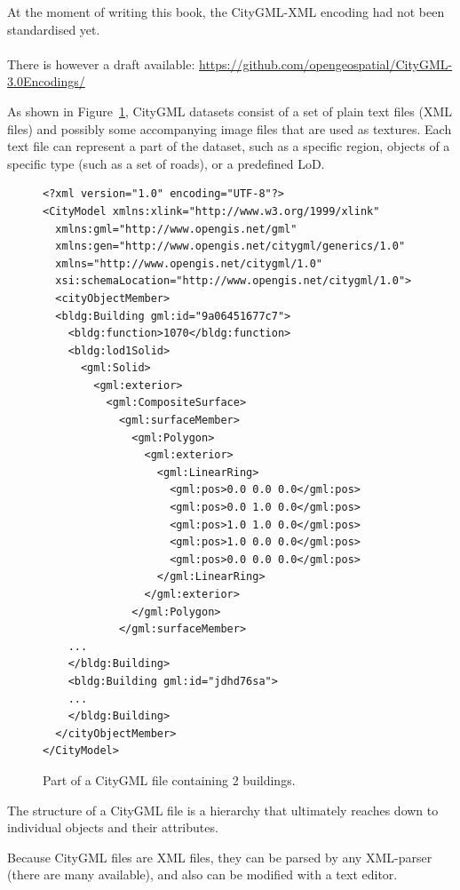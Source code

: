 \begin{kaobox-toread}[frametitle=\faExclamationTriangle\ There is not XML encoding yet for CityGML v3.0.0]
  At the moment of writing this book, the CityGML-XML encoding had not been standardised yet.
  \\ \\
  There is however a draft available: \url{https://github.com/opengeospatial/CityGML-3.0Encodings/}
\end{kaobox-toread}


%

As shown in Figure~\ref{fig:citygml_file}, CityGML datasets consist of a set of plain text files (XML files) and possibly some accompanying image files that are used as textures. 
Each text file can represent a part of the dataset, such as a specific region, objects of a specific type (such as a set of roads), or a predefined LoD\@.
\begin{figure}
\begin{lstlisting}
<?xml version="1.0" encoding="UTF-8"?>
<CityModel xmlns:xlink="http://www.w3.org/1999/xlink" 
  xmlns:gml="http://www.opengis.net/gml" 
  xmlns:gen="http://www.opengis.net/citygml/generics/1.0" 
  xmlns="http://www.opengis.net/citygml/1.0" 
  xsi:schemaLocation="http://www.opengis.net/citygml/1.0">
  <cityObjectMember>
  <bldg:Building gml:id="9a06451677c7">
    <bldg:function>1070</bldg:function>
    <bldg:lod1Solid>
      <gml:Solid>
        <gml:exterior>
          <gml:CompositeSurface>
            <gml:surfaceMember>
              <gml:Polygon>
                <gml:exterior>
                  <gml:LinearRing>
                    <gml:pos>0.0 0.0 0.0</gml:pos>
                    <gml:pos>0.0 1.0 0.0</gml:pos>
                    <gml:pos>1.0 1.0 0.0</gml:pos>
                    <gml:pos>1.0 0.0 0.0</gml:pos>
                    <gml:pos>0.0 0.0 0.0</gml:pos>
                  </gml:LinearRing>
                </gml:exterior>
              </gml:Polygon>
            </gml:surfaceMember>
    ...
    </bldg:Building>
    <bldg:Building gml:id="jdhd76sa">
    ...
    </bldg:Building>
  </cityObjectMember>
</CityModel>
\end{lstlisting}
\caption{Part of a CityGML file containing 2 buildings.}%
\label{fig:citygml_file}
\end{figure}
The structure of a CityGML file is a hierarchy that ultimately reaches down to individual objects and their attributes. 

Because CityGML files are XML files, they can be parsed by any XML-parser (there are many available), and also can be modified with a text editor.


